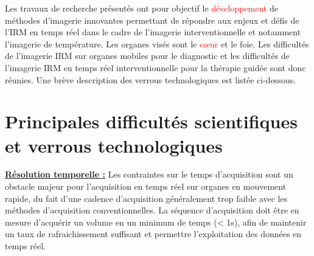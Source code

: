 Les travaux de recherche présentés ont pour objectif le \textcolor{red}{développement} de méthodes d’imagerie innovantes permettant de répondre aux enjeux et défis de l’IRM en temps réel dans le cadre de l’imagerie interventionnelle et notamment l’imagerie de température. Les organes visés sont le \textcolor{red}{cœur} et le foie. Les difficultés de l’imagerie IRM sur organes mobiles pour le diagnostic et les difficultés de l’imagerie IRM en temps réel interventionnelle pour la thérapie guidée sont donc réunies. Une brève description des verrous technologiques est listée ci-dessous.

\section{Principales difficultés scientifiques et verrous technologiques}
\label{chap1-verrous}

\underline{\textbf{Résolution temporelle :}} Les contraintes sur le temps d’acquisition sont un obstacle majeur pour l’acquisition en temps réel sur organes en mouvement rapide, du fait d’une cadence d’acquisition généralement trop faible avec les méthodes d’acquisition conventionnelles. La séquence d’acquisition doit être en mesure d’acquérir un volume en un minimum de temps (< 1s), afin de maintenir un taux de rafraichissement suffisant et permettre l’exploitation des données en temps réel.\\